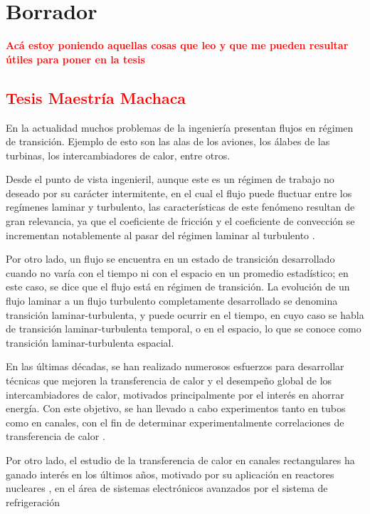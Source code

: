\chapter{Borrador}

\textcolor{red}{\textbf{Acá estoy poniendo aquellas cosas que leo y que me pueden resultar útiles para poner en la tesis}}


\newpage

\section{\textcolor{red}{Tesis Maestría Machaca}}

En la actualidad muchos problemas de la ingeniería presentan flujos en régimen de transición. Ejemplo de esto son las alas de los aviones, los  álabes de las turbinas, los intercambiadores de calor, entre otros. 

Desde el punto de vista ingenieril, aunque este es un régimen de trabajo no deseado por su carácter intermitente, en el cual el flujo puede fluctuar entre los regímenes laminar y turbulento, las características de este fenómeno resultan de gran relevancia, ya que el coeficiente de fricción \cite{white} y el coeficiente de convección \cite{incropera} se incrementan notablemente al pasar del régimen laminar al turbulento \cite{tam2006transitional}.

Por otro lado, un flujo se encuentra en un estado de transición desarrollado cuando no varía con el tiempo ni con el espacio en un promedio estadístico; en este caso, se dice que el flujo está en régimen de transición. La evolución de un flujo laminar a un flujo turbulento completamente desarrollado se denomina transición laminar-turbulenta, y puede ocurrir en el tiempo, en cuyo caso se habla de transición laminar-turbulenta temporal, o en el espacio, lo que se conoce como transición laminar-turbulenta espacial.


En las últimas décadas, se han realizado numerosos esfuerzos para desarrollar técnicas que mejoren la transferencia de calor y el desempeño global de los intercambiadores de calor, motivados principalmente por el interés en ahorrar energía. Con este objetivo, se han llevado a cabo experimentos tanto en tubos como en canales, con el fin de determinar experimentalmente correlaciones de transferencia de calor \cite{hausen1959new, gnielinski1976new, churchill1977comprehensive, sleicher1975convenient}.

Por otro lado, el estudio de la transferencia de calor en canales rectangulares ha ganado interés en los últimos años, motivado por su aplicación en reactores nucleares \cite{sikorska2024convective}, en el área de sistemas electrónicos avanzados por el sistema de refrigeración \cite{kamdem2020numerical}

